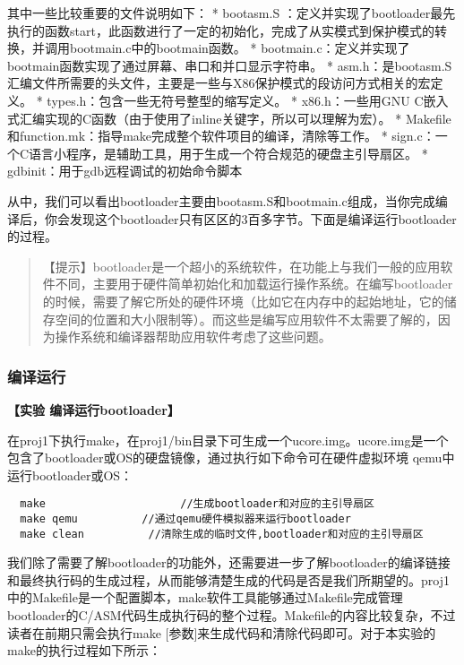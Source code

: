 其中一些比较重要的文件说明如下： * bootasm.S
：定义并实现了bootloader最先执行的函数start，此函数进行了一定的初始化，完成了从实模式到保护模式的转换，并调用bootmain.c中的bootmain函数。
*
bootmain.c：定义并实现了bootmain函数实现了通过屏幕、串口和并口显示字符串。
*
asm.h：是bootasm.S汇编文件所需要的头文件，主要是一些与X86保护模式的段访问方式相关的宏定义。
* types.h：包含一些无符号整型的缩写定义。 * x86.h：一些用GNU
C嵌入式汇编实现的C函数（由于使用了inline关键字，所以可以理解为宏）。 *
Makefile和function.mk：指导make完成整个软件项目的编译，清除等工作。 *
sign.c：一个C语言小程序，是辅助工具，用于生成一个符合规范的硬盘主引导扇区。
* gdbinit：用于gdb远程调试的初始命令脚本

从中，我们可以看出bootloader主要由bootasm.S和bootmain.c组成，当你完成编译后，你会发现这个bootloader只有区区的3百多字节。下面是编译运行bootloader的过程。

\begin{quote}
【提示】bootloader是一个超小的系统软件，在功能上与我们一般的应用软件不同，主要用于硬件简单初始化和加载运行操作系统。在编写bootloader的时候，需要了解它所处的硬件环境（比如它在内存中的起始地址，它的储存空间的位置和大小限制等）。而这些是编写应用软件不太需要了解的，因为操作系统和编译器帮助应用软件考虑了这些问题。
\end{quote}

\subsubsection{编译运行}\label{ux7f16ux8bd1ux8fd0ux884c}

\textbf{【实验 编译运行bootloader】}

在proj1下执行make，在proj1/bin目录下可生成一个ucore.img。ucore.img是一个包含了bootloader或OS的硬盘镜像，通过执行如下命令可在硬件虚拟环境
qemu中运行bootloader或OS：

\begin{lstlisting}
  make                     //生成bootloader和对应的主引导扇区
  make qemu          //通过qemu硬件模拟器来运行bootloader
  make clean          //清除生成的临时文件,bootloader和对应的主引导扇区
\end{lstlisting}


我们除了需要了解bootloader的功能外，还需要进一步了解bootloader的编译链接和最终执行码的生成过程，从而能够清楚生成的代码是否是我们所期望的。proj1中的Makefile是一个配置脚本，make软件工具能够通过Makefile完成管理bootloader的C/ASM代码生成执行码的整个过程。Makefile的内容比较复杂，不过读者在前期只需会执行make
{[}参数{]}来生成代码和清除代码即可。对于本实验的make的执行过程如下所示：

